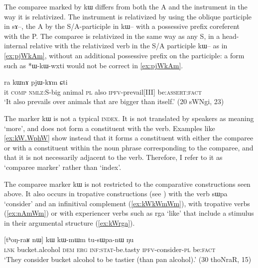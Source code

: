 \documentclass[oldfontcommands,oneside,a4paper,11pt]{article}
\newcommand{\ipa}[1]{{\phon #1}} %
\begin{document}
The comparee marked by \ipa{kɯ} differs from both the A and the instrument in the way it is relativized. The instrument is relativized by using the oblique participle in \ipa{sɤ--}, the A by the S/A-participle in \ipa{kɯ--} with a possessive prefix coreferent with the P. The comparee is relativized in the same way as any S, in a head-internal relative with the relativized verb in the S/A participle  \ipa{kɯ--} as in \ref{ex:pjWkAm}, without an additional possessive prefix on the participle: a form such as *\ipa{ɯ-kɯ-wxti} would not be correct in \ref{ex:pjWkAm}.

 
 
\begin{exe}
\ex \label{ex:pjWkAm}
\gll
[\ipa{ɯʑo}  	\ipa{sɤz}  	\ipa{kɯ-wxti}]  	\ipa{rɯdaʁ}  	\ipa{ra}  	\ipa{kɯnɤ}  	\ipa{pjɯ-kɤm}  	\ipa{ɕti}  \\
it \textsc{comp} \textsc{nmlz}:S-big animal \textsc{pl} also \textsc{ipfv}-prevail[III] be:\textsc{assert}:\textsc{fact} \\
\glt `It also prevails over animals that are bigger than itself.' (20 sWNgi, 23)
  \end{exe}

 
The marker   \ipa{kɯ} is not a typical  \textsc{index}. It is not translated by speakers as meaning `more', and does not form a constituent with the verb. Examples like \ref{ex:kW.WphW} show instead that it forms a constituent with either the comparee or with a constituent within the noun phrase corresponding to the comparee, and that it is not necessarily adjacent to the verb. Therefore, I refer to it as `comparee marker' rather than  `index'.

  
The comparee marker \ipa{kɯ} is not restricted to the comparative constructions seen above. It also occurs in  tropative constructions (see \citealt{jacques13tropative}) with the verb \ipa{sɯpa} `consider' and an infinitival complement (\ref{ex:kWkWmWm}), with   tropative verbs (\ref{ex:nAmWm}) or with experiencer verbs such as \ipa{rga} `like' that include  a stimulus in their argumental structure (\ref{ex:kWrga}).

\begin{exe}
\ex \label{ex:kWkWmWm}
\gll  \ipa{tɕe}   [\ipa{tʰoŋ-raʁ}   	\ipa{nɯ}]   	\ipa{kɯ}   	\ipa{kɯ-mɯm}   	\ipa{tu-sɯpa-nɯ}   	\ipa{ŋu}   \\
\textsc{lnk} bucket.alcohol \textsc{dem} \textsc{erg} \textsc{inf:stat}-be.tasty \textsc{ipfv}-consider-\textsc{pl} be:\textsc{fact} \\
\glt `They consider  bucket alcohol to be tastier (than pan alcohol).' (30 thoNraR, 15)
\end{exe}
\end{document}
